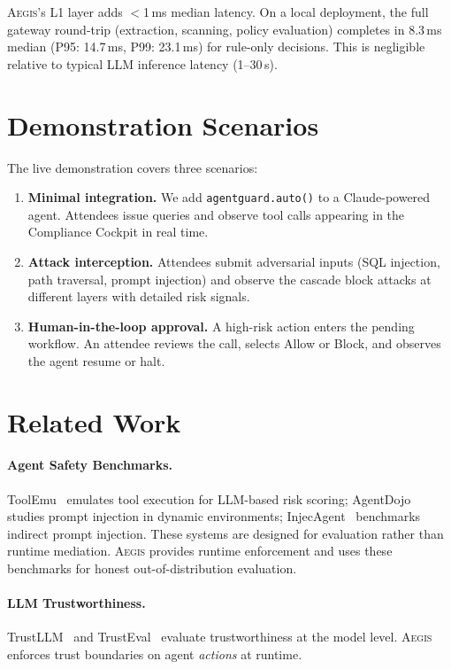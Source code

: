\documentclass[sigconf,anonymous]{acmart}
\newcommand{\system}{\textsc{Aegis}\xspace}
\begin{document}
\system's L1 layer adds $<$1\,ms median latency. On a local deployment, the full gateway round-trip (extraction, scanning, policy evaluation) completes in 8.3\,ms median (P95: 14.7\,ms, P99: 23.1\,ms) for rule-only decisions. This is negligible relative to typical LLM inference latency (1--30\,s).

\section{Demonstration Scenarios}

The live demonstration covers three scenarios:
\begin{enumerate}[nolistsep, leftmargin=*]
\item \textbf{Minimal integration.} We add \texttt{agentguard.auto()} to a Claude-powered agent. Attendees issue queries and observe tool calls appearing in the Compliance Cockpit in real time.
\item \textbf{Attack interception.} Attendees submit adversarial inputs (SQL injection, path traversal, prompt injection) and observe the cascade block attacks at different layers with detailed risk signals.
\item \textbf{Human-in-the-loop approval.} A high-risk action enters the pending workflow. An attendee reviews the call, selects Allow or Block, and observes the agent resume or halt.
\end{enumerate}

\section{Related Work}
\label{sec:related}

\paragraph{Agent Safety Benchmarks.}
ToolEmu~\cite{ruan2024toolemu} emulates tool execution for LLM-based risk scoring; AgentDojo~\cite{debenedetti2024agentsec} studies prompt injection in dynamic environments; InjecAgent~\cite{zhan2024injecagent} benchmarks indirect prompt injection. These systems are designed for evaluation rather than runtime mediation. \system provides runtime enforcement and uses these benchmarks for honest out-of-distribution evaluation.

\paragraph{LLM Trustworthiness.}
TrustLLM~\cite{huang2024position} and TrustEval~\cite{wang2024trusteval} evaluate trustworthiness at the model level. \system enforces trust boundaries on agent \emph{actions} at runtime.
\end{document}
